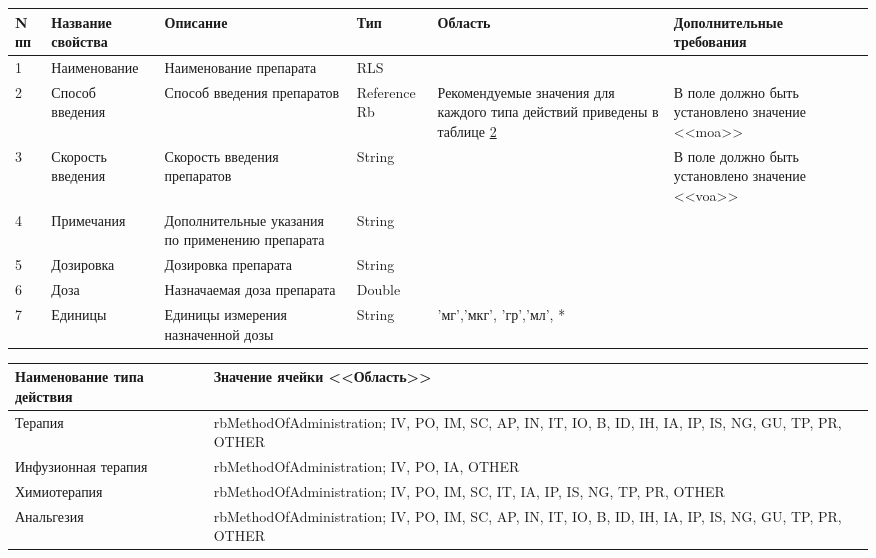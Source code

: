 {\small
\begin{table}
 \label{tbl_spr_ln} 
\begin{tabular}{|p{0.55cm}|p{3.5cm}|p{3.5cm}|p{2.15cm}|p{2.4cm}|p{3.6cm}|}
  \hline \rule{0pt}{15pt} \centering \textbf{N пп} & \centering \textbf{Название свойства} & \centering \textbf{Описание} & \centering \textbf{Тип} & \centering \textbf{Область} & \hfil \textbf{Дополни\-тель\-ные требования} \\ \hline
  1	& Наименование	& Наименование препарата	& RLS & &  \\ \hline		
  2	& Способ введения	& Способ введения препаратов & 	Reference Rb	& Рекомен\-дуемые значения для каждого типа действий приведены в таблице \ref{tbl_spr_ln_spv} &  В поле \dm{Код} должно быть установлено значение <<moa>>  \\ \hline
  3	& Скорость введения	& Скорость введения препаратов & 	String	&  &	В поле \dm{Код} должно быть установлено значение <<voa>>  \\ \hline
  4	& Примечания & Дополнитель\-ные указания по применению препарата & String & &  \\ \hline		
  5	& Дозировка	& Дозировка препарата & String &  &  \\ \hline		
  6	& Доза	& Назначаемая доза препарата & Double &  &  \\ \hline		
  7	& Единицы	& Единицы измерения назначенной дозы & 	String & 'мг','мкг', 'гр','мл', * &  \\ \hline	
 \end{tabular}
\end{table}
}

{\small
\begin{table}[ht!]
 \label{tbl_spr_ln_spv} 
 \begin{tabular}{|p{5cm}|p{11.8cm}|}
  \hline \rule{0pt}{15pt} \centering \textbf{Наименование типа действия} & \hfil \textbf{Значение ячейки <<Область>>} \\ \hline
 Терапия &	rbMethodOfAdministration; IV, PO, IM, SC, AP, IN, IT, IO, B, ID, IH, IA, IP, IS, NG, GU, TP, PR, OTHER \\ \hline
 Инфузионная терапия &	rbMethodOfAdministration; IV, PO, IA, OTHER \\ \hline
 Химиотерапия &	rbMethodOfAdministration; IV, PO, IM, SC, IT, IA, IP, IS, NG, TP, PR, OTHER \\ \hline
 Анальгезия	& rbMethodOfAdministration; IV, PO, IM, SC, AP, IN, IT, IO, B, ID, IH, IA, IP, IS, NG, GU, TP, PR, OTHER \\ \hline
 \end{tabular}
\end{table}
}

